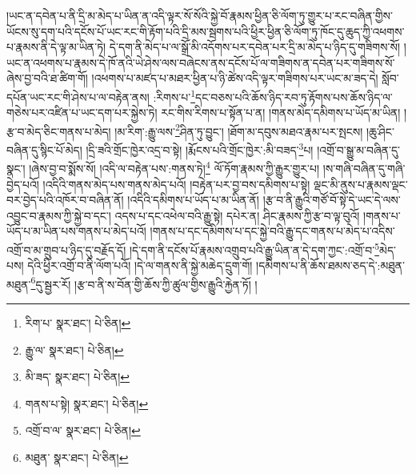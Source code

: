 །ཡང་ན་དབེན་པ་ནི་དྲི་མ་མེད་པ་ཡིན་ན་འདི་ལྟར་སོ་སོའི་སྐྱེ་བོ་རྣམས་ཕྱིན་ཅི་ལོག་ཏུ་གྱུར་པ་རང་བཞིན་གྱིས་ཡོངས་སུ་དག་པའི་དངོས་པོ་ཡང་རང་གི་རྟོག་པའི་དྲི་མས་སྦགས་པའི་ཕྱིར་ཕྱིན་ཅི་ལོག་ཏུ་ཁོང་དུ་ཆུད་ཀྱི་འཕགས་པ་རྣམས་ནི་དེ་ལྟ་མ་ཡིན་ཏེ། དེ་དག་ནི་མེད་པ་ལ་སྒྲོ་མི་འདོགས་པར་དབེན་པར་དྲི་མ་མེད་པ་ཉིད་དུ་གཟིགས་སོ། །ཡང་ན་འཕགས་པ་རྣམས་དེ་ཁོ་ནའི་ཡེ་ཤེས་ལས་བཞེངས་ནས་དངོས་པོ་ལ་གཟིགས་ན་དབེན་པར་གཟིགས་སོ་ཞེས་བྱ་བའི་ཐ་ཚིག་གོ། །འཕགས་པ་མཛད་པ་མཐར་ཕྱིན་པ་ཉི་ཚེས་འདི་ལྟར་གཟིགས་པར་ཡང་མ་ཟད་དེ། སློབ་དཔོན་ཡང་རང་གི་ཤེས་པ་ལ་བརྟེན་ནས། :རིགས་པ་\footnote{རིག་པ་  སྣར་ཐང་།  པེ་ཅིན། }དང་བཅས་པའི་ཆོས་ཉིད་རབ་ཏུ་རྟོགས་པས་ཆོས་ཉིད་ལ་གཅེས་པར་འཛིན་པ་ཡང་དག་པར་སྐྱེས་ཏེ། རང་གིས་རིགས་པ་སྟོན་པ་ན། །གནས་མེད་དམིགས་པ་ཡོད་མ་ཡིན། །རྩ་བ་མེད་ཅིང་གནས་པ་མེད། །མ་རིག་:རྒྱུ་ལས་\footnote{རྒྱུ་ལ་  སྣར་ཐང་།  པེ་ཅིན། }ཤིན་ཏུ་བྱུང་། །ཐོག་མ་དབུས་མཐའ་རྣམ་པར་སྤངས། །ཆུ་ཤིང་བཞིན་དུ་སྙིང་པོ་མེད། །དྲི་ཟའི་གྲོང་ཁྱེར་འདྲ་བ་སྟེ། །རྨོངས་པའི་གྲོང་ཁྱེར་:མི་བཟད་\footnote{མི་ཟད་  སྣར་ཐང་།  པེ་ཅིན། }པ། །འགྲོ་བ་སྒྱུ་མ་བཞིན་དུ་སྣང་། །ཞེས་བྱ་བ་སྨོས་སོ། །འདི་ལ་བརྟེན་པས་:གནས་ཏེ།\footnote{གནས་པ་སྟེ།  སྣར་ཐང་།  པེ་ཅིན། } ལོ་ཏོག་རྣམས་ཀྱི་རྒྱུར་གྱུར་པ། །ས་གཞི་བཞིན་དུ་གཞི་བྱེད་པའོ། །འདིའི་གནས་མེད་པས་གནས་མེད་པའོ། །བརྟེན་པར་བྱ་བས་དམིགས་པ་སྟེ། ལྡང་མི་ནུས་པ་རྣམས་ལྡང་བར་བྱེད་པའི་འཁོར་བ་བཞིན་ནོ། །འདིའི་དམིགས་པ་ཡོད་པ་མ་ཡིན་ནོ། །རྩ་བ་ནི་རྒྱུའི་གཙོ་བོ་སྟེ་དེ་ཡང་དེ་ལས་འབྱུང་བ་རྣམས་ཀྱི་སྐྱེ་བ་དང་། འདས་པ་དང་འཕེལ་བའི་རྒྱུ་སྟེ། དཔེར་ན། ཤིང་རྣམས་ཀྱི་རྩ་བ་ལྟ་བུའོ། །གནས་པ་ཡོད་པ་མ་ཡིན་པས་གནས་པ་མེད་པའོ། །གནས་པ་དང་དམིགས་པ་དང་སྐྱེ་བའི་རྒྱུ་དང་གནས་པ་མེད་པ་འདིས་འགྲོ་བ་མ་གྲུབ་པ་ཉིད་དུ་བརྗོད་དོ། །དེ་དག་ནི་དངོས་པོ་རྣམས་འགྲུབ་པའི་རྒྱུ་ཡིན་ན་དེ་དག་ཀྱང་:འགྲོ་བ་\footnote{འགྲོ་བ་ལ་  སྣར་ཐང་།  པེ་ཅིན། }མེད་པས། དེའི་ཕྱིར་འགྲོ་བ་ནི་ལོག་པའོ། །དེ་ལ་གནས་ནི་སྐྱེ་མཆེད་དྲུག་གོ། །དམིགས་པ་ནི་ཆོས་ཐམས་ཅད་དེ་:མཐུན་མཐུན་\footnote{མཐུན་  སྣར་ཐང་།  པེ་ཅིན། }དུ་སྦྱར་རོ། །རྩ་བ་ནི་ས་བོན་གྱི་ཆོས་ཀྱི་ཚུལ་གྱིས་རྒྱུའི་རྐྱེན་ཏོ། །
